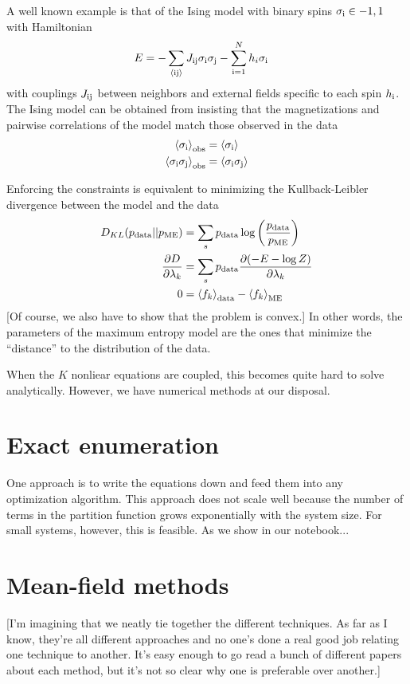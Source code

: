 \documentclass[aps,prl,twocolumn]{revtex4-1}
\begin{document}
A well known example is that of the Ising model with binary spins $\sigma_{\rm i} \in {-1,1}$ with Hamiltonian 
\begin{align}
	E &= -\sum_{\left<\rm ij\right>} J_{\rm ij}\sigma_{\rm i}\sigma_{\rm j} -\sum_{\rm i=1}^N h_i\sigma_{\rm i}
\end{align}
with couplings $J_{\rm ij}$ between neighbors and external fields specific to each spin $h_{\rm i}$. The Ising model can be obtained from insisting that the magnetizations and pairwise correlations of the model match those observed in the data
\begin{align}
	\left<\sigma_{\rm i}\right>_{\rm obs} &= \left<\sigma_{\rm i}\right>\\
	\left<\sigma_{\rm i}\sigma_{\rm j}\right>_{\rm obs} &= \left<\sigma_{\rm i}\sigma_{\rm j}\right>
\end{align}

Enforcing the constraints is equivalent to minimizing the Kullback-Leibler divergence between the model and the data \cite{Cover:2006tl}
\begin{align}
	D_{KL}(p_{\rm data}||p_{\rm ME}) &= \sum_s p_{\rm data} \log\left(\frac{p_{\rm data}}{p_{\rm ME}}\right)\\
	\frac{\partial D}{\partial \lambda_k} &= \sum_s p_{\rm data} \frac{\partial (-E-\log Z)}{\partial \lambda_k}\\
	0 &= \left<f_k\right>_{\rm data} -\left<f_k\right>_{\rm ME}
\end{align}
[Of course, we also have to show that the problem is convex.] In other words, the parameters of the maximum entropy model are the ones that minimize the ``distance'' to the distribution of the data.

When the $K$ nonliear equations are coupled, this becomes quite hard to solve analytically. However, we have numerical methods at our disposal.

\section{Exact enumeration}
One approach is to write the equations down and feed them into any optimization algorithm. This approach does not scale well because the number of terms in the partition function grows exponentially with the system size. For small systems, however, this is feasible. As we show in our notebook...

\section{Mean-field methods}
[I'm imagining that we neatly tie together the different techniques. As far as I know, they're all different approaches and no one's done a real good job relating one technique to another. It's easy enough to go read a bunch of different papers about each method, but it's not so clear why one is preferable over another.]
\end{document}
